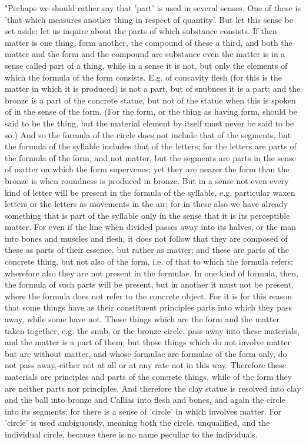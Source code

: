 "Perhaps we should rather say that 'part' is used in several senses.
One of these is 'that which measures another thing in respect of quantity'.
But let this sense be set aside; let us inquire about the parts of
which substance consists. If then matter is one thing, form another,
the compound of these a third, and both the matter and the form and
the compound are substance even the matter is in a sense called part
of a thing, while in a sense it is not, but only the elements of which
the formula of the form consists. E.g. of concavity flesh (for this
is the matter in which it is produced) is not a part, but of snubness
it is a part; and the bronze is a part of the concrete statue, but
not of the statue when this is spoken of in the sense of the form.
(For the form, or the thing as having form, should be said to be the
thing, but the material element by itself must never be said to be
so.) And so the formula of the circle does not include that of the
segments, but the formula of the syllable includes that of the letters;
for the letters are parts of the formula of the form, and not matter,
but the segments are parts in the sense of matter on which the form
supervenes; yet they are nearer the form than the bronze is when roundness
is produced in bronze. But in a sense not even every kind of letter
will be present in the formula of the syllable, e.g. particular waxen
letters or the letters as movements in the air; for in these also
we have already something that is part of the syllable only in the
sense that it is its perceptible matter. For even if the line when
divided passes away into its halves, or the man into bones and muscles
and flesh, it does not follow that they are composed of these as parts
of their essence, but rather as matter; and these are parts of the
concrete thing, but not also of the form, i.e. of that to which the
formula refers; wherefore also they are not present in the formulae.
In one kind of formula, then, the formula of such parts will be present,
but in another it must not be present, where the formula does not
refer to the concrete object. For it is for this reason that some
things have as their constituent principles parts into which they
pass away, while some have not. Those things which are the form and
the matter taken together, e.g. the snub, or the bronze circle, pass
away into these materials, and the matter is a part of them; but those
things which do not involve matter but are without matter, and whose
formulae are formulae of the form only, do not pass away,-either not
at all or at any rate not in this way. Therefore these materials are
principles and parts of the concrete things, while of the form they
are neither parts nor principles. And therefore the clay statue is
resolved into clay and the ball into bronze and Callias into flesh
and bones, and again the circle into its segments; for there is a
sense of 'circle' in which involves matter. For 'circle' is used ambiguously,
meaning both the circle, unqualified, and the individual circle, because
there is no name peculiar to the individuals. 

